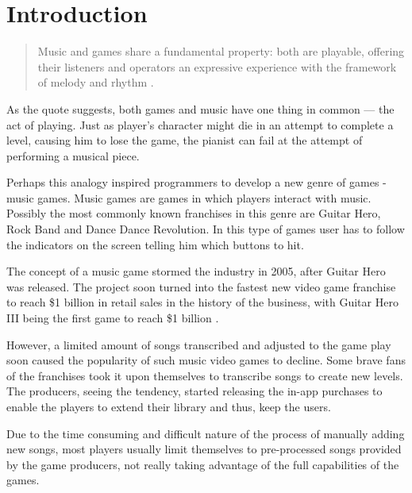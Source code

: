 
\chapter{Introduction} %

\label{Chapter1} %



\begin{quotation}
Music and games share a fundamental property: both are playable, offering their listeners and operators an expressive experience with the framework of melody and rhythm \cite{introquote}.
\end{quotation} 

As the quote suggests, both games and music have one thing in common — the act of playing. Just as player’s character might die in an attempt to complete a level, causing him to lose the game, the pianist can fail at the attempt of performing a musical piece. 

Perhaps this analogy inspired programmers to develop a new genre of games - music games. Music games are games in which players interact with music. Possibly the most commonly known franchises in this genre are Guitar Hero, Rock Band and Dance Dance Revolution. In this type of games user has to follow the indicators on the screen telling him which buttons to hit. 

The concept of a music game stormed the industry in 2005, after Guitar Hero was released. The project soon turned into the fastest new video game franchise to reach \$1 billion in retail sales in the history of the business, with Guitar Hero III being the first game to reach \$1 billion \cite{GHSales}.

However, a limited amount of songs transcribed and adjusted to the game play soon caused the popularity of such music video games to decline. Some brave fans of the franchises took it upon themselves to transcribe songs to create new levels. The producers, seeing the tendency, started releasing the in-app purchases to enable the players to extend their library and thus, keep the users. 

Due to the time consuming and difficult nature of the process of manually adding new songs, most players usually limit themselves to pre-processed songs provided by the game producers, not really taking advantage of the full capabilities of the games. 

